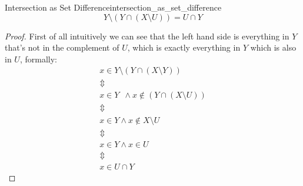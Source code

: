 \begin{proposition}{Intersection as Set
Difference}{intersection_as_set_difference}
\[
Y \setminus \left( Y \cap  \left( X \setminus U \right)  \right) =  U \cap  Y
\]
\end{proposition}
\begin{proof}
    First of all intuitively we can see that the left hand side is everything in
    \( Y \) that's not in the complement of \( U \), which is exactly everything
    in \( Y \) which is also in \( U \), formally:
    \begin{gather*}
        x \in  Y \setminus \left( Y \cap  \left( X \setminus Y \right)  \right)
        \\
        \Updownarrow \\
        x \in  Y \enspace \land  x \not\in \left( Y \cap \left( X \setminus U
        \right)  \right) \\
        \Updownarrow \\
        x \in  Y \land x \not\in X \setminus U\\
        \Updownarrow \\
        x \in  Y \land  x \in  U\\
        \Updownarrow \\
        x \in  U \cap  Y
    \end{gather*}
\end{proof}
